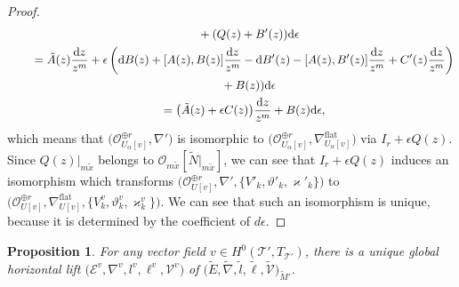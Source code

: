 \documentclass[pdftex]{sigma}
\numberwithin{equation}{section}
\newtheorem{Proposition}[Theorem]{Proposition}
\begin{document}
\begin{proof}
\begin{gather*}
 \qquad\quad{}
 +(Q(z)+B'(z)){\rm d}\epsilon
 \\
\qquad{} =
 \tilde{A}(z)\frac{{\rm d}z} {z^m}
 +\epsilon \left( {\rm d}B(z) + [A(z),B(z)] \frac {{\rm d}z} {z^m}
 -{\rm d}B'(z) - [A(z),B'(z)]\frac{{\rm d}z} {z^m} + C'(z)\frac{{\rm d}z} {z^m} \right)\\
 \qquad\quad{}
 +B(z)){\rm d}\epsilon
 \\
\qquad{} =
 \big( \tilde{A}(z)+\epsilon C(z) \big) \frac {{\rm d}z} {z^m} +B(z) {\rm d}\epsilon,
\end{gather*}
which means that
$\big({\mathcal O}_{U_{\alpha}[v]}^{\oplus r}, \nabla'\big)$
is isomorphic to
$\big(
{\mathcal O}_{U_{\alpha}[v]}^{\oplus r} ,
\nabla^{\mathrm{flat}}_{U_{\alpha}[v]} \big)$
via $I_r+\epsilon Q(z)$.
Since $Q(z)|_{m\tilde{x}}$ belongs to
${\mathcal O}_{m\tilde{x}}[\tilde{N}|_{m\tilde{x}}]$,
we can see that
$I_r+\epsilon Q(z)$ induces an isomorphism
which transforms
$\big({\mathcal O}_{U[v]}^{\oplus r}, \nabla',
\{ V'_k,\vartheta'_k,\varkappa'_k \} \big)$
to
$\big(
{\mathcal O}_{U[v]}^{\oplus r} ,
\nabla^{\mathrm{flat}}_{U[v]} ,
\big\{
V^v_k,\vartheta^v_k,\varkappa^v_k \big\} \big)$.
We can see that such an isomorphism is unique,
because it is determined by
the coefficient of $d\epsilon$.
\end{proof}

\begin{Proposition} \label{proposition: horizontal lift in one variable}
For any vector field
$v\in H^0({\mathcal T'},T_{\mathcal T'})$,
there is a unique global horizontal lift
$\big({\mathcal E}^v,\nabla^v, l^v,\ell^v,{\mathcal V}^v\big)$
of
$\big(\tilde{E},\tilde{\nabla},\tilde{l},\tilde{\ell},\tilde{\mathcal V}\big)_{\tilde{M}'}$.
\end{Proposition}
\end{document}
